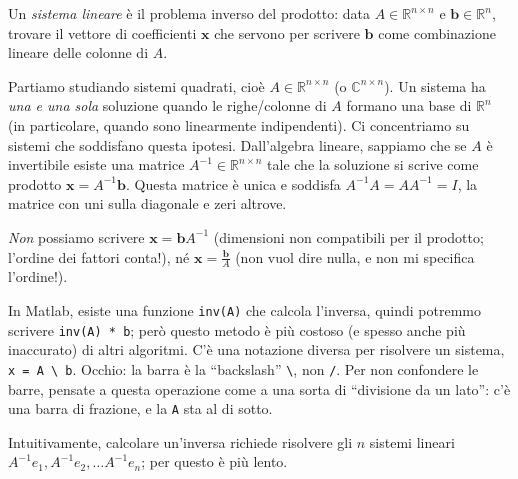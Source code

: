 \documentclass[a4paper]{report}
\theoremstyle{definiton}
\theoremstyle{remark}
\begin{document}

Un \emph{sistema lineare} è il problema inverso del prodotto: data $A\in\mathbb{R}^{n\times n}$ e $\mathbf{b} \in \mathbb{R}^n$, trovare il vettore di coefficienti $\mathbf{x}$ che servono per scrivere $\mathbf{b}$ come combinazione lineare delle colonne di $A$.

Partiamo studiando sistemi quadrati, cioè $A \in \mathbb{R}^{n\times n}$ (o $\mathbb{C}^{n\times n}$). Un sistema ha \emph{una e una sola} soluzione quando le righe/colonne di $A$ formano una base di $\mathbb{R}^n$ (in particolare, quando sono linearmente indipendenti). Ci concentriamo su sistemi che soddisfano questa ipotesi. Dall'algebra lineare, sappiamo che se $A$ è invertibile esiste una matrice $A^{-1}\in\mathbb{R}^{n\times n}$ tale che la soluzione si scrive come prodotto $\mathbf{x} = A^{-1}\mathbf{b}$. Questa matrice è unica e soddisfa $A^{-1}A=AA^{-1}= I$, la matrice con uni sulla diagonale e zeri altrove.

\emph{Non} possiamo scrivere $\mathbf{x} = \mathbf{b}A^{-1}$ (dimensioni non compatibili per il prodotto; l'ordine dei fattori conta!), né $\mathbf{x} = \frac{\mathbf{b}}{A}$ (non vuol dire nulla, e non mi specifica l'ordine!).

In Matlab, esiste una funzione \lstinline{inv(A)} che calcola l'inversa, quindi potremmo scrivere \lstinline{inv(A) * b}; però questo metodo è più costoso (e spesso anche più inaccurato) di altri algoritmi. C'è una notazione diversa per risolvere un sistema, \lstinline{x = A \ b}. Occhio: la barra è la ``backslash'' \lstinline!\!, non \lstinline{/}. Per non confondere le barre, pensate a questa operazione come a una sorta di ``divisione da un lato'': c'è una barra di frazione, e la \lstinline{A} sta al di sotto.

Intuitivamente, calcolare un'inversa richiede risolvere gli $n$ sistemi lineari $A^{-1}e_1, A^{-1}e_2,\dots A^{-1}e_n$; per questo è più lento.
\end{document}
